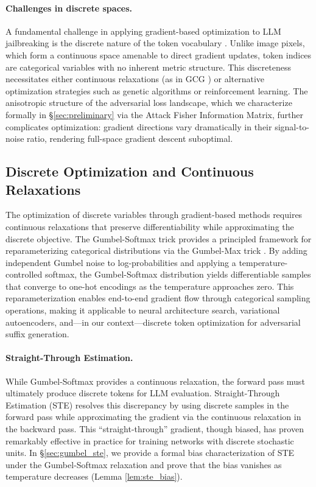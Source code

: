 ﻿\documentclass[lettersize,journal]{IEEEtran}
\begin{document}
\paragraph{Challenges in discrete spaces.} A fundamental challenge in applying gradient-based optimization to LLM jailbreaking is the discrete nature of the token vocabulary \cite{chen2023gradient_optimization_zdhx}. Unlike image pixels, which form a continuous space amenable to direct gradient updates, token indices are categorical variables with no inherent metric structure. This discreteness necessitates either continuous relaxations (as in GCG \cite{zou2023universal}) or alternative optimization strategies such as genetic algorithms or reinforcement learning. The anisotropic structure of the adversarial loss landscape, which we characterize formally in \S\ref{sec:preliminary} via the Attack Fisher Information Matrix, further complicates optimization: gradient directions vary dramatically in their signal-to-noise ratio, rendering full-space gradient descent suboptimal.

\subsection{Discrete Optimization and Continuous Relaxations}
\label{sec:rw_discrete}

The optimization of discrete variables through gradient-based methods requires continuous relaxations that preserve differentiability while approximating the discrete objective. The Gumbel-Softmax trick \cite{jang2017categorical, maddison2017concrete} provides a principled framework for reparameterizing categorical distributions via the Gumbel-Max trick \cite{gumbel1954statistical}. By adding independent Gumbel noise to log-probabilities and applying a temperature-controlled softmax, the Gumbel-Softmax distribution yields differentiable samples that converge to one-hot encodings as the temperature approaches zero. This reparameterization enables end-to-end gradient flow through categorical sampling operations, making it applicable to neural architecture search, variational autoencoders, and---in our context---discrete token optimization for adversarial suffix generation.

\paragraph{Straight-Through Estimation.} While Gumbel-Softmax provides a continuous relaxation, the forward pass must ultimately produce discrete tokens for LLM evaluation. Straight-Through Estimation (STE) \cite{bengio2013estimating} resolves this discrepancy by using discrete samples in the forward pass while approximating the gradient via the continuous relaxation in the backward pass. This ``straight-through'' gradient, though biased, has proven remarkably effective in practice for training networks with discrete stochastic units. In \S\ref{sec:gumbel_ste}, we provide a formal bias characterization of STE under the Gumbel-Softmax relaxation and prove that the bias vanishes as temperature decreases (Lemma \ref{lem:ste_bias}).
\end{document}
